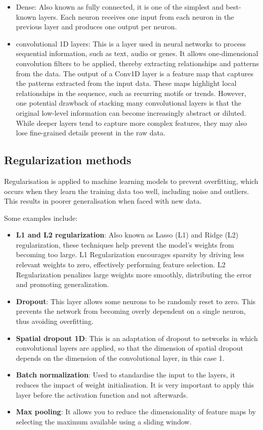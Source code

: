 \begin{itemize}
    \item Dense: Also known as fully connected, it is one of the simplest and best-known layers. Each neuron receives one input from each neuron in the previous layer and produces one output per neuron.
    \item convolutional 1D layers: This is a layer used in neural networks to process sequential information, such as text, audio or genes. It allows one-dimensional convolution filters to be applied, thereby extracting relationships and patterns from the data. The output of a Conv1D layer is a feature map that captures the patterns extracted from the input data. These maps highlight local relationships in the sequence, such as recurring motifs or trends. However, one potential drawback of stacking many convolutional layers is that the original low-level information can become increasingly abstract or diluted. While deeper layers tend to capture more complex features, they may also lose fine-grained details present in the raw data.
\end{itemize}

\subsection{Regularization methods}

Regularisation is applied to machine learning models to prevent overfitting, which occurs when they learn the training data too well, including noise and outliers. This results in poorer generalisation when faced with new data.

Some examples include:
\begin{itemize}
    \item \textbf{L1 and L2 regularization}: Also known as Lasso (L1) and Ridge (L2) regularization, these techniques help prevent the model's weights from becoming too large. L1 Regularization encourages sparsity by driving less relevant weights to zero, effectively performing feature selection. L2 Regularization penalizes large weights more smoothly, distributing the error and promoting generalization.
    \item \textbf{Dropout}: This layer allows some neurons to be randomly reset to zero. This prevents the network from becoming overly dependent on a single neuron, thus avoiding overfitting.
    \item \textbf{Spatial dropout 1D}: This is an adaptation of dropout to networks in which convolutional layers are applied, so that the dimension of spatial dropout depends on the dimension of the convolutional layer, in this case 1.
    \item \textbf{Batch normalization}: Used to standardise the input to the layers, it reduces the impact of weight initialisation. It is very important to apply this layer before the activation function and not afterwards.
    \item \textbf{Max pooling}: It allows you to reduce the dimensionality of feature maps by selecting the maximum available using a sliding window.
\end{itemize}



